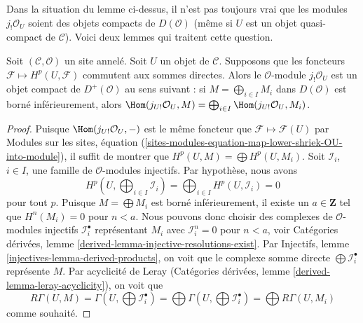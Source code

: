 \noindent
Dans la situation du lemme ci-dessus, il n'est pas toujours vrai que les
modules $j_!\mathcal{O}_U$ soient des objets compacts de $D(\mathcal{O})$
(même si $U$ est un objet quasi-compact de $\mathcal{C}$). Voici deux lemmes
qui traitent cette question.


\begin{lemma}
\label{lemma-when-jshriek-lower-compact}
Soit $(\mathcal{C}, \mathcal{O})$ un site annelé. Soit $U$ un objet de
$\mathcal{C}$. Supposons que les foncteurs
$\mathcal{F} \mapsto H^p(U, \mathcal{F})$ commutent aux sommes directes. Alors
le $\mathcal{O}$-module $j_!\mathcal{O}_U$ est un objet compact de
$D^+(\mathcal{O})$ au sens suivant : si
$M = \bigoplus_{i \in I} M_i$ dans $D(\mathcal{O})$ est borné inférieurement,
alors $\Hom(j_{U!}\mathcal{O}_U, M) =
\bigoplus_{i \in I} \Hom(j_{U!}\mathcal{O}_U, M_i)$.
\end{lemma}

\begin{proof}
Puisque $\Hom(j_{U!}\mathcal{O}_U, -)$ est le même foncteur que
$\mathcal{F} \mapsto \mathcal{F}(U)$ par Modules sur les sites, équation
(\ref{sites-modules-equation-map-lower-shriek-OU-into-module}), il suffit de
montrer que $H^p(U, M) = \bigoplus H^p(U, M_i)$. Soit $\mathcal{I}_i$,
$i \in I$, une famille de $\mathcal{O}$-modules injectifs. Par hypothèse,
nous avons
$$
H^p(U, \bigoplus\nolimits_{i \in I} \mathcal{I}_i) =
\bigoplus\nolimits_{i \in I} H^p(U, \mathcal{I}_i) = 0
$$
pour tout $p$. Puisque $M = \bigoplus M_i$ est borné inférieurement, il
existe un $a \in \mathbf{Z}$ tel que $H^n(M_i) = 0$ pour $n < a$. Nous
pouvons donc choisir des complexes de $\mathcal{O}$-modules injectifs
$\mathcal{I}_i^\bullet$ représentant $M_i$ avec $\mathcal{I}_i^n = 0$ pour
$n < a$, voir Catégories dérivées, lemme
\ref{derived-lemma-injective-resolutions-exist}. Par Injectifs, lemme
\ref{injectives-lemma-derived-products}, on voit que le complexe somme directe
$\bigoplus \mathcal{I}_i^\bullet$ représente $M$. Par acyclicité de Leray
(Catégories dérivées, lemme \ref{derived-lemma-leray-acyclicity}), on voit que
$$
R\Gamma(U, M) = \Gamma(U, \bigoplus \mathcal{I}_i^\bullet) =
\bigoplus \Gamma(U, \bigoplus \mathcal{I}_i^\bullet) =
\bigoplus R\Gamma(U, M_i)
$$
comme souhaité.
\end{proof}

